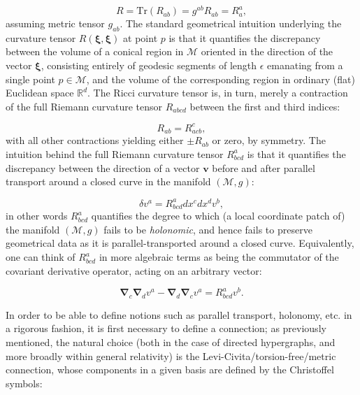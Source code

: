 \documentclass{article}
\begin{document}
\begin{equation}
R = \mathrm{Tr} \left( R_{a b} \right) = g^{a b} R_{a b} = R_{a}^{a},
\end{equation}
assuming metric tensor ${g_{a b}}$. The standard geometrical intuition underlying the curvature tensor ${R \left( \boldsymbol\xi, \boldsymbol\xi \right)}$ at point $p$ is that it quantifies the discrepancy between the volume of a conical region in ${\mathcal{M}}$ oriented in the direction of the vector ${\boldsymbol\xi}$, consisting entirely of geodesic segments of length ${\epsilon}$ emanating from a single point ${p \in \mathcal{M}}$, and the volume of the corresponding region in ordinary (flat) Euclidean space ${\mathbb{R}^d}$. The Ricci curvature tensor is, in turn, merely a contraction of the full Riemann curvature tensor ${R_{a b c d}}$ between the first and third indices:

\begin{equation}
R_{a b} = R_{a c b}^{c},
\end{equation}
with all other contractions yielding either ${\pm R_{a b}}$ or zero, by symmetry. The intuition behind the full Riemann curvature tensor ${R_{b c d}^{a}}$ is that it quantifies the discrepancy between the direction of a vector ${\mathbf{v}}$ before and after parallel transport around a closed curve in the manifold ${\left( \mathcal{M}, g \right)}$:

\begin{equation}
\delta v^a = R_{b c d}^{a} d x^c d x^d v^b,
\end{equation}
in other words ${R_{b c d}^{a}}$ quantifies the degree to which (a local coordinate patch of) the manifold ${\left( \mathcal{M}, g \right)}$ fails to be \textit{holonomic}, and hence fails to preserve geometrical data as it is parallel-transported around a closed curve. Equivalently, one can think of ${R_{b c d}^{a}}$ in more algebraic terms as being the commutator of the covariant derivative operator, acting on an arbitrary vector:

\begin{equation}
\boldsymbol\nabla_c \boldsymbol\nabla_d v^a - \boldsymbol\nabla_d \boldsymbol\nabla_c v^a = R_{b c d}^{a} v^b.
\end{equation}

In order to be able to define notions such as parallel transport, holonomy, etc. in a rigorous fashion, it is first necessary to define a connection; as previously mentioned, the natural choice (both in the case of directed hypergraphs, and more broadly within general relativity) is the Levi-Civita/torsion-free/metric connection, whose components in a given basis are defined by the Christoffel symbols:
\end{document}
